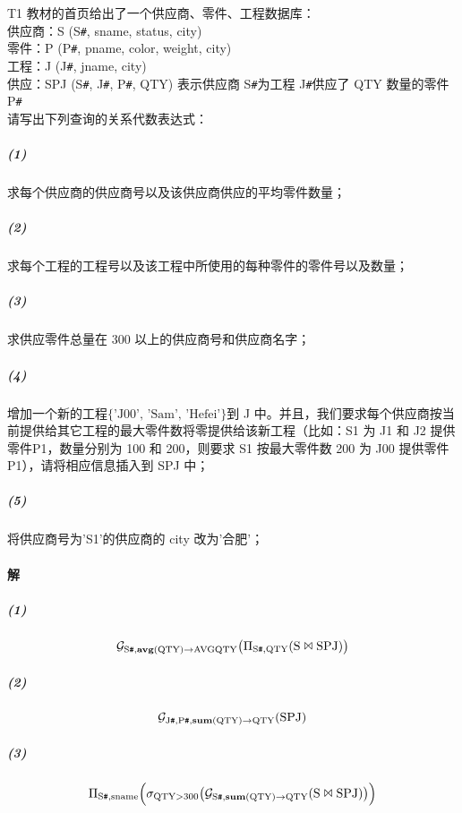 \documentclass{article}
\makeatletter
\renewcommand{\section}{\@startsection{section}{1}{0mm}
                                {-5ex plus -.5ex minus -.2ex}
                                {3ex plus .2ex}
                                {\normalfont\large\bfseries}}
\makeatother
\begin{document}
\section{T1 教材的首页给出了一个供应商、零件、工程数据库：
  \protect\\ \indent 供应商：S (S\texttt{\#}, sname, status, city)
  \protect\\ \indent 零件：P (P\texttt{\#}, pname, color, weight, city)
  \protect\\ \indent 工程：J (J\texttt{\#}, jname, city)
  \protect\\ \indent 供应：SPJ (S\texttt{\#}, J\texttt{\#}, P\texttt{\#}, QTY) 表示供应商 S\texttt{\#}为工程 J\texttt{\#}供应了 QTY 数量的零件 P\texttt{\#}
  \protect\\ 请写出下列查询的关系代数表达式：}
\subparagraph{(1)} 求每个供应商的供应商号以及该供应商供应的平均零件数量；
\subparagraph{(2)} 求每个工程的工程号以及该工程中所使用的每种零件的零件号以及数量；
\subparagraph{(3)} 求供应零件总量在 300 以上的供应商号和供应商名字；
\subparagraph{(4)} 增加一个新的工程$\{\text{'J00'},\, \text{'Sam'},\, \text{'Hefei'}\}$到 J 中。并且，我们要求每个供应商按当前提供给其它工程的最大零件数将零提供给该新工程（比如：S1 为 J1 和 J2 提供零件P1，数量分别为 100 和 200，则要求 S1 按最大零件数 200 为 J00 提供零件 P1），请将相应信息插入到 SPJ 中；
\subparagraph{(5)} 将供应商号为'S1'的供应商的 city 改为'合肥'；

\paragraph{解}
\subparagraph{(1)}
\begin{Large}
    \begin{equation*}
        \mathcal{G}_{\text{S\texttt{\#}}, \textbf{avg}(\text{QTY}) \rightarrow \text{AVGQTY}}\big(\Pi_{\text{S\texttt{\#}}, \text{QTY}}(\text{S} \Join \text{SPJ})\big)
    \end{equation*}
\end{Large}

\subparagraph{(2)}
\begin{Large}
    \begin{equation*}
        \mathcal{G}_{\text{J\texttt{\#}}, \text{P\texttt{\#}}, \textbf{sum}(\text{QTY}) \rightarrow \text{QTY}}(\text{SPJ})
    \end{equation*}
\end{Large}

\subparagraph{(3)}
\begin{Large}
    \begin{equation*}
        \Pi_{\text{S\texttt{\#}}, \text{sname}}\Big(\sigma_{\text{QTY} > 300}\big(\mathcal{G}_{\text{S\texttt{\#}}, \textbf{sum}(\text{QTY}) \rightarrow \text{QTY}}(\text{S} \Join \text{SPJ})\big)\Big)
    \end{equation*}
\end{Large}
\end{document}
